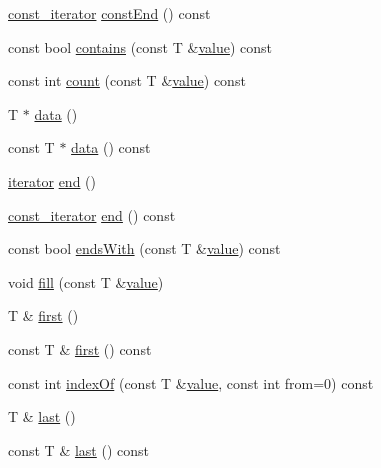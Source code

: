 \begin{DoxyCompactItemize}
\item 
\hyperlink{classprism_1_1_array_ab78c83a88959a72d59e5f930540be94a}{const\+\_\+iterator} \hyperlink{classprism_1_1_array_a275ef3df386f5f8c3c785a0eba0f15a0}{const\+End} () const 
\item 
const bool \hyperlink{classprism_1_1_array_ab1dbaaa25fdd52114ecf83764d07dd32}{contains} (const T \&\hyperlink{classprism_1_1_array_a2c5690996975510eed7112066b936d8f}{value}) const 
\item 
const int \hyperlink{classprism_1_1_array_a17090694f8652c186aef26882a387c05}{count} (const T \&\hyperlink{classprism_1_1_array_a2c5690996975510eed7112066b936d8f}{value}) const 
\item 
T $\ast$ \hyperlink{classprism_1_1_array_a6d53be4d71c511149f3639a7f14863b8}{data} ()
\item 
const T $\ast$ \hyperlink{classprism_1_1_array_a5b28a077a7db27fc8c2c4fed1f20c3a9}{data} () const 
\item 
\hyperlink{classprism_1_1_array_a6814c2af67e8b3fc48b02319f5e63d50}{iterator} \hyperlink{classprism_1_1_array_afca59b5cf554b93d97b3e4d131d7d964}{end} ()
\item 
\hyperlink{classprism_1_1_array_ab78c83a88959a72d59e5f930540be94a}{const\+\_\+iterator} \hyperlink{classprism_1_1_array_a630f7f0c9e70d7bd86b093723c068b1f}{end} () const 
\item 
const bool \hyperlink{classprism_1_1_array_a8f8ecd4d34589f7cbc28d6f14fd3de9a}{ends\+With} (const T \&\hyperlink{classprism_1_1_array_a2c5690996975510eed7112066b936d8f}{value}) const 
\item 
void \hyperlink{classprism_1_1_array_a366f1c9b89d2133171a0ed2bb54534ce}{fill} (const T \&\hyperlink{classprism_1_1_array_a2c5690996975510eed7112066b936d8f}{value})
\item 
T \& \hyperlink{classprism_1_1_array_a342f29ffb8147cca71c204777bca5b2e}{first} ()
\item 
const T \& \hyperlink{classprism_1_1_array_abf7cb06917a0bea41a0c260da91227a5}{first} () const 
\item 
const int \hyperlink{classprism_1_1_array_aa3eca6ff8f386eed2ddfcf615e1f4bc1}{index\+Of} (const T \&\hyperlink{classprism_1_1_array_a2c5690996975510eed7112066b936d8f}{value}, const int from=0) const 
\item 
T \& \hyperlink{classprism_1_1_array_ae3d2272f0b2fec20a3a59746454871e6}{last} ()
\item 
const T \& \hyperlink{classprism_1_1_array_ab651f9c888450cc836e8b9586bbe2776}{last} () const 
\item 

\end{DoxyCompactItemize}

